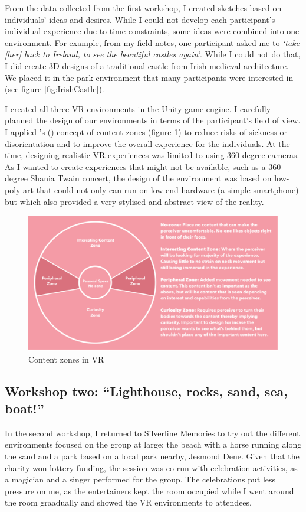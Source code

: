 From the data collected from the first workshop, I created sketches based on individuals' ideas and desires. While I could not develop each participant's individual experience due to time constraints, some ideas were combined into one environment. For example, from my field notes, one participant asked me to \textit{`take [her] back to Ireland, to see the beautiful castles again’}. While I could not do that, I did create 3D designs of a traditional castle from Irish medieval architecture. We placed it in the park environment that many participants were interested in (see figure \ref{fig:IrishCastle}).

I created all three VR environments in the Unity game engine. I carefully planned the design of our environments in terms of the participant's field of view. I applied \citeauthor{alger_visual_2015}'s (\citeyear{alger_visual_2015}) concept of content zones (figure \ref{fig:ContentZone}) to reduce risks of sickness or disorientation and to improve the overall experience for the individuals. At the time, designing realistic VR experiences was limited to using 360-degree cameras. As I wanted to create experiences that might not be available, such as a 360-degree Shania Twain concert, the design of the environment was based on low-poly art that could not only can run on low-end hardware (a simple smartphone) but which also provided a very stylised and abstract view of the reality.

\begin{figure}[htp]
\centering
\includegraphics[width=.8\linewidth]{Images/ChapterFour/ContentZones.png}
\caption{Content zones in VR}
\label{fig:ContentZone}
\end{figure}

\subsection{Workshop two: ``Lighthouse, rocks, sand, sea, boat!''}
\label{StudyOne:WorkshopTwo}
In the second workshop, I returned to Silverline Memories to try out the different environments focused on the group at large: the beach with a horse running along the sand and a park based on a local park nearby, Jesmond Dene. Given that the charity won lottery funding, the session was co-run with celebration activities, as a magician and a singer performed for the group. The celebrations put less pressure on me, as the entertainers kept the room occupied while I went around the room graadually and showed the VR environments to attendees. 

